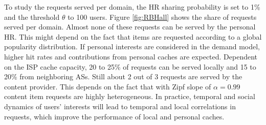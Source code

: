 To study the requests served per domain, the HR sharing probability is set to 1\% and the threshold $\theta$ to 100 users.
Figure \ref{fig:RBHall} shows the share of requests served per domain. Almost none of these requests can be served by the personal HR. This might depend on the fact that items are requested according to a global popularity distribution.
If personal interests are considered in the demand model, higher hit rates and contributions from personal caches are expected. Dependent on the ISP cache capacity, 20 to 25\% of requests can be served locally and 15 to 20\% from neighboring ASs. Still about 2 out of 3 requests are served by the content provider. This depends on the fact that with Zipf slope of $\alpha = 0.99$ content item requests are highly heterogeneous. In practice, temporal and social dynamics of users' interests will lead to temporal and local correlations in requests, which improve the performance of local and personal caches.
